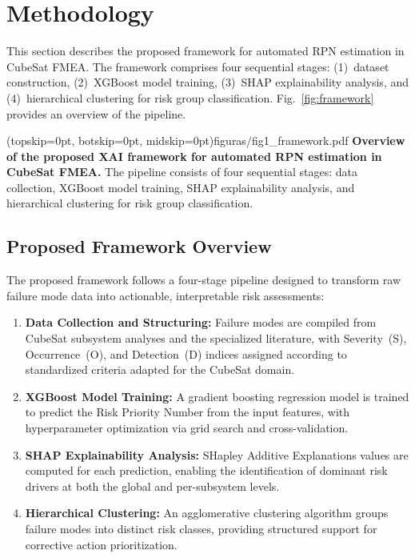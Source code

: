 \section{Methodology}
\label{sec:methodology}

This section describes the proposed framework for automated RPN estimation in CubeSat FMEA. The framework comprises four sequential stages: (1)~dataset construction, (2)~XGBoost model training, (3)~SHAP explainability analysis, and (4)~hierarchical clustering for risk group classification. Fig.~\ref{fig:framework} provides an overview of the pipeline.

\Figure[t!](topskip=0pt, botskip=0pt, midskip=0pt){figuras/fig1_framework.pdf}
{\textbf{Overview of the proposed XAI framework for automated RPN estimation in CubeSat FMEA.} The pipeline consists of four sequential stages: data collection, XGBoost model training, SHAP explainability analysis, and hierarchical clustering for risk group classification.\label{fig:framework}}

\subsection{Proposed Framework Overview}
\label{subsec:framework_overview}

The proposed framework follows a four-stage pipeline designed to transform raw failure mode data into actionable, interpretable risk assessments:

\begin{enumerate}
\item \textbf{Data Collection and Structuring:} Failure modes are compiled from CubeSat subsystem analyses and the specialized literature, with Severity~(S), Occurrence~(O), and Detection~(D) indices assigned according to standardized criteria adapted for the CubeSat domain.
\item \textbf{XGBoost Model Training:} A gradient boosting regression model is trained to predict the Risk Priority Number from the input features, with hyperparameter optimization via grid search and cross-validation.
\item \textbf{SHAP Explainability Analysis:} SHapley Additive Explanations values are computed for each prediction, enabling the identification of dominant risk drivers at both the global and per-subsystem levels.
\item \textbf{Hierarchical Clustering:} An agglomerative clustering algorithm groups failure modes into distinct risk classes, providing structured support for corrective action prioritization.
\end{enumerate}

